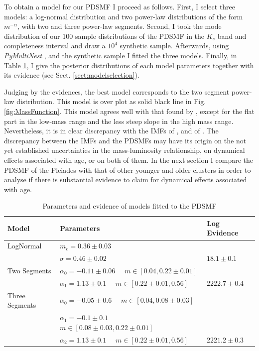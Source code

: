 To obtain a  model for our PDSMF I proceed as follows. First, I select three models: a log-normal distribution and two power-law distributions of the form $m^{-\alpha}$, with two and three power-law segments. Second, I took the mode distribution of our 100 sample distributions of the PDSMF in the $K_s$ band and completeness interval and draw a $10^4$ synthetic sample. Afterwards, using \emph{PyMultiNest} \citep{Buchner2014}, and the synthetic sample I fitted the three models. Finally, in Table \ref{tab:fitPDSMF}, I give the posterior distributions of each model parameters together with its evidence (see Sect. \ref{sect:modelselection}).

Judging by the evidences, the best model corresponds to the two segment power-law distribution. This model is over plot as solid black line in Fig. \ref{fig:MassFunction}. This model agrees well with that found by \citet{Bouy2015}, except for the flat part in the low-mass range and the less steep slope in the high mass range. Nevertheless, it is in clear discrepancy with the IMFs of \citet{Chabrier2005},  \cite[$m_c=0.25_{-0.016}^{+0.021}$ and $\sigma=0.55_{-0.01}^{+0.05}$, the uncertainties are those reported by][for single objects]{Chabrier2003} and of \citet{Thies2007}. The discrepancy between the IMFs and the PDSMFs \cite[][and ours]{Bouy2015} may have its origin on the not yet established uncertainties in the mass-luminosity relationship, on dynamical effects associated with age, or on both of them. In the next section I compare the PDSMF of the Pleiades with that of other younger and older clusters in order to analyse if there is substantial evidence to claim for dynamical effects associated with age.

\begin{table}[ht!]
\caption{Parameters and evidence of models fitted to the PDSMF}
\begin{center}
\begin{tabular}{lll}
Model&Parameters& Log Evidence\\
\hline
LogNormal&$m_c=0.36\pm0.03$&\\
                 &$\sigma=0.46\pm0.02$ & $18.1 \pm 0.1$\\
\hline
Two Segments &$\alpha_0=-0.11\pm0.06$ \ \ $m \in [0.04,0.22\pm0.01]$ & \\ 
&  $\alpha_1=1.13\pm0.1$ \ \ $m \in [0.22\pm0.01,0.56]$&$2222.7\pm0.4$\\
\hline
Three Segments &$\alpha_0=-0.05\pm0.6$ \ \ $m \in [0.04,0.08\pm0.03]$ & \\
                          &$\alpha_1=-0.1\pm0.1$ \ \ $m \in [0.08\pm0.03,0.22\pm0.01]$ & \\ 
                          &$\alpha_2=1.13\pm0.1$ \ \ $m \in [0.22\pm0.01,0.56]$&$2221.2\pm 0.3$\\
\hline
\end{tabular}
\end{center}
\label{tab:fitPDSMF}
\end{table}%

